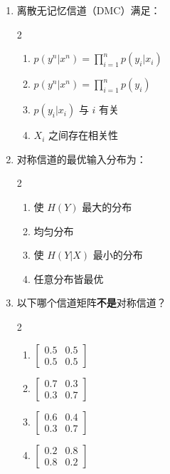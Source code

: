 \documentclass[12pt,a4paper]{ctexart}
\begin{document}
\begin{enumerate}[label=\arabic*., leftmargin=*]

\item 离散无记忆信道（DMC）满足：
\begin{multicols}{2}
\begin{enumerate}[label=(\Alph*)]
  \item $p(y^n|x^n) = \prod_{i=1}^n p(y_i|x_i)$
  \item $p(y^n|x^n) = \prod_{i=1}^n p(y_i)$
  \item $p(y_i|x_i)$ 与 $i$ 有关
  \item $X_i$ 之间存在相关性
\end{enumerate}
\end{multicols}

\item 对称信道的最优输入分布为：
\begin{multicols}{2}
\begin{enumerate}[label=(\Alph*)]
  \item 使 $H(Y)$ 最大的分布
  \item 均匀分布
  \item 使 $H(Y|X)$ 最小的分布
  \item 任意分布皆最优
\end{enumerate}
\end{multicols}

\item 以下哪个信道矩阵\textbf{不是}对称信道？
\begin{multicols}{2}
\begin{enumerate}[label=(\Alph*)]
  \item $\begin{bmatrix} 0.5 & 0.5 \\ 0.5 & 0.5 \end{bmatrix}$
  \item $\begin{bmatrix} 0.7 & 0.3 \\ 0.3 & 0.7 \end{bmatrix}$
  \item $\begin{bmatrix} 0.6 & 0.4 \\ 0.3 & 0.7 \end{bmatrix}$
  \item $\begin{bmatrix} 0.2 & 0.8 \\ 0.8 & 0.2 \end{bmatrix}$
\end{enumerate}
\end{multicols}


\end{enumerate}
\end{document}
